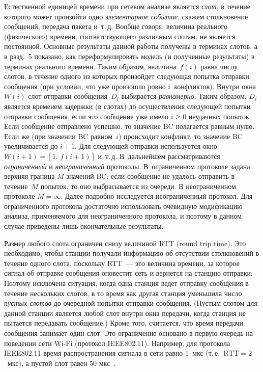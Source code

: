 \begin{multicols}{2}
 Естественной  единицей времени  при сетевом анализе
является  {\it слот}, в  течение которого может произойти одно {\it
элементарное событие}, скажем  столкновение сообщений, передача
пакета и~т.\,д.  Вообще говоря, величина реального (физического)
времени, соответствующего различным слотам, не является постоянной.
 Основные    результаты данной работы получены в терминах слотов,
а  в  разд.~5   показано, как переформулировать модель (и
полученные результаты) в терминах реального времени. Таким образом,
величина~$f(i)$ равна числу слотов, в течение одного из  которых
произойдет сле\-ду\-ющая попытка  отправки сообщения (при условии, что
уже произошло ровно $i$~конфликтов).
 Внутри  окна $W(i)$ слот отправки сообщения~$D_i$
выбирается {\it равномерно}. Таким образом, $D_i$ является временем
задержки (в слотах) до осуществления следующей попытки отправки
сообщения, если это сообщение уже имело $i\ge 0$ неудачных попыток.
Если сообщение отправлено успешно, то значение BC полагается равным
нулю. Если же (при значении BC равном~$i$) происходит конфликт, то
значение BC увеличивается до $i+1$. Для следующей  отправки
используется окно  $W(i+1)=[1,\, f(i+1)]$ и~т.\,д. В~дальнейшем
рассматриваются  {\it ограниченный} и {\it неограниченный}
протоколы. В~ограниченном протоколе задана верхняя граница  $M$
значений BC: если сообщение не удалось отправить в течение~$M$
попыток, то оно выбрасывается  из очереди. В неограниченном
протоколе $M=\infty$. Далее подробно исследуется неограниченный
протокол. Для ограниченного протокола достаточно использовать
очевидную модификацию анализа, применяемого для неограниченного
протокола, и поэтому в данном случае   приведены лишь окончательные
результаты.

Размер  любого  слота ограничен снизу величиной RTT (round trip
time). Это необходимо,  чтобы станции получали информацию  об отсутствии столкновений
 в течение одного слота, поскольку  RTT~--- это величина
времени, за которое  сигнал об отправке сообщения оповестит  сеть и
вернется  на станцию  отправки. Поэтому исключена  ситуация, когда
одна станция   ведет отправку сообщения в течение нескольких слотов,
в то время  как  другая  станция уменьшила число  {\it пустых
слотов} до очередной попытки отправки сообщения.  (Пустым слотом для
данной станции является любой слот внутри окна передачи, когда
станция не пытается передавать сообщение.)
 Кроме того, считается, что время передачи сообщения занимает один слот.
 Это ограничение основано в первую очередь на поведении сети Wi-Fi (протокол
IEEE802.11). Например, для  протокола IEEE802.11 время
распространения сигнала в  сети равно 1~мкс (т.\,е.\  $\mathrm{RTT}= 2$~мкс), а
пустой слот равен 50 мкс~\cite{IEEE80211, VISHN}.


\end{multicols}
